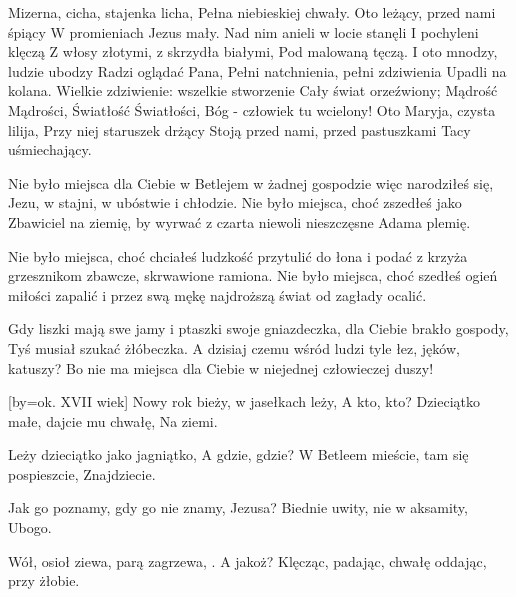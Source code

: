 \beginverse
Mizerna, cicha, stajenka licha,
Pełna niebieskiej chwały.
Oto leżący, przed nami śpiący
W promieniach Jezus mały.
\endverse
\beginverse
Nad nim anieli w locie stanęli
I pochyleni klęczą
Z włosy złotymi, z skrzydła białymi,
Pod malowaną tęczą.
\endverse
\beginverse
I oto mnodzy, ludzie ubodzy
Radzi oglądać Pana,
Pełni natchnienia, pełni zdziwienia
Upadli na kolana.
\endverse
\beginverse
Wielkie zdziwienie: wszelkie stworzenie
Cały świat orzeźwiony;
Mądrość Mądrości, Światłość Światłości,
Bóg - człowiek tu wcielony!
\endverse
\beginverse
Oto Maryja, czysta lilija,
Przy niej staruszek drżący
Stoją przed nami, przed pastuszkami
Tacy uśmiechający.
\endverse
\endsong


\beginverse
Nie było miejsca dla Ciebie
w Betlejem w żadnej gospodzie
więc narodziłeś się, Jezu,
w stajni, w ubóstwie i chłodzie.
\endverse
\beginchorus
Nie było miejsca, choć zszedłeś
jako Zbawiciel na ziemię,
by wyrwać z czarta niewoli
nieszczęsne Adama plemię.
\endchorus

\beginverse
Nie było miejsca, choć chciałeś
ludzkość przytulić do łona
i podać z krzyża grzesznikom
zbawcze, skrwawione ramiona.
\endverse
\beginchorus
Nie było miejsca, choć szedłeś
ogień miłości zapalić
i przez swą mękę najdroższą
świat od zagłady ocalić.
\endchorus

\beginverse
Gdy liszki mają swe jamy
i ptaszki swoje gniazdeczka,
dla Ciebie brakło gospody,
Tyś musiał szukać żłóbeczka.
\endverse
\beginchorus
A dzisiaj czemu wśród ludzi
tyle łez, jęków, katuszy?
Bo nie ma miejsca dla Ciebie
w niejednej człowieczej duszy!
\endchorus
\endsong


[by=ok. XVII wiek]
\beginverse
Nowy rok bieży, w jasełkach leży,
A kto, kto?
\endverse
\beginchorus
Dzieciątko małe, dajcie mu chwałę,
Na ziemi.
\endchorus

\beginverse
Leży dzieciątko jako jagniątko,
A gdzie, gdzie?
\endverse
\beginchorus
W Betleem mieście, tam się pospieszcie,
Znajdziecie.
\endchorus

\beginverse
Jak go poznamy, gdy go nie znamy,
Jezusa?
\endverse
\beginchorus
Biednie uwity, nie w aksamity,
Ubogo.
\endchorus

\beginverse
Wół, osioł ziewa, parą zagrzewa, .
A jakoż?
\endverse
\beginchorus
Klęcząc, padając, chwałę oddając,
przy żłobie.
\endchorus

